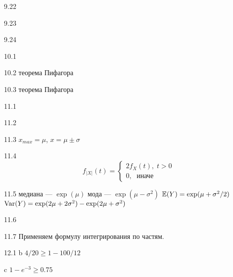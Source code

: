 \protect \hypertarget {soln:9.22}{}
\begin{solution}{{9.22}}
\end{solution}
\protect \hypertarget {soln:9.23}{}
\begin{solution}{{9.23}}
\end{solution}
\protect \hypertarget {soln:9.24}{}
\begin{solution}{{9.24}}
\end{solution}
\protect \hypertarget {soln:10.1}{}
\begin{solution}{{10.1}}
\end{solution}
\protect \hypertarget {soln:10.2}{}
\begin{solution}{{10.2}}
теорема Пифагора
\end{solution}
\protect \hypertarget {soln:10.3}{}
\begin{solution}{{10.3}}
теорема Пифагора
\end{solution}
\protect \hypertarget {soln:11.1}{}
\begin{solution}{{11.1}}
\end{solution}
\protect \hypertarget {soln:11.2}{}
\begin{solution}{{11.2}}
\end{solution}
\protect \hypertarget {soln:11.3}{}
\begin{solution}{{11.3}}
$x_{max}=\mu$, $x=\mu \pm \sigma$
\end{solution}
\protect \hypertarget {soln:11.4}{}
\begin{solution}{{11.4}}
  \[
  f_{|X|}(t) =
  \begin{cases}
  2f_X(t), \; t>0 \\
  0, \; \text{ иначе }
  \end{cases}
  \]
\end{solution}
\protect \hypertarget {soln:11.5}{}
\begin{solution}{{11.5}}
  медиана — $\exp(\mu)$
  мода — $\exp(\mu - \sigma^2)$
  $\mathbb{E}(Y)=\exp(\mu+\sigma^2/2)$
  $\operatorname{Var}(Y)=\exp(2\mu + 2\sigma^2)-\exp(2\mu + \sigma^2)$

\end{solution}
\protect \hypertarget {soln:11.6}{}
\begin{solution}{{11.6}}
\end{solution}
\protect \hypertarget {soln:11.7}{}
\begin{solution}{{11.7}}
  Применяем формулу интегрирования по частям.
\end{solution}
\protect \hypertarget {soln:12.1}{}
\begin{solution}{{12.1}}
  b $4/20\geq 1-100/12$

  c $1-e^{-3}\geq 0.75$
\end{solution}
